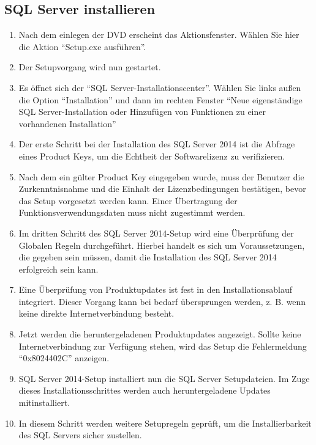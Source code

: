       \subsection{SQL Server installieren}
        \begin{enumerate}
          \item Nach dem einlegen der DVD erscheint das Aktionsfenster. Wählen Sie
          hier die Aktion \enquote{Setup.exe ausführen}.
          \item Der Setupvorgang wird nun gestartet.
          \item Es öffnet sich der \enquote{SQL Server-Installationscenter}.
          Wählen Sie links außen die Option \enquote{Installation} und dann im
          rechten Fenster \enquote{Neue eigenständige SQL Server-Installation
          oder Hinzufügen von Funktionen zu einer vorhandenen Installation}
          \item Der erste Schritt bei der Installation des SQL Server 2014
          ist die Abfrage eines Product Keys, um die Echtheit der Softwarelizenz
          zu verifizieren.
          \item Nach dem ein gülter Product Key eingegeben wurde, muss der
          Benutzer die Zurkenntnisnahme und die Einhalt der Lizenzbedingungen
          bestätigen, bevor das Setup vorgesetzt werden kann. Einer Übertragung
          der Funktionsverwendungsdaten muss nicht zugestimmt werden.
          \item Im dritten Schritt des SQL Server 2014-Setup wird eine
          Überprüfung der Globalen Regeln durchgeführt. Hierbei handelt es sich
          um Voraussetzungen, die gegeben sein müssen, damit die Installation
          des SQL Server 2014 erfolgreich sein kann.
          \item Eine Überprüfung von Produktupdates ist fest in den
          Installationsablauf integriert. Dieser Vorgang kann bei bedarf
          übersprungen werden, z. B. wenn keine direkte Internetverbindung
          besteht.
\clearpage
          \item Jetzt werden die heruntergeladenen Produktupdates angezeigt.
          Sollte keine Internetverbindung zur Verfügung stehen, wird das Setup
          die Fehlermeldung \enquote{0x8024402C} anzeigen.
          \item SQL Server 2014-Setup installiert nun die SQL Server
          Setupdateien. Im Zuge dieses Installationsschrittes werden auch
          heruntergeladene Updates mitinstalliert.
\clearpage
          \item In diesem Schritt werden weitere Setupregeln geprüft, um die
          Installierbarkeit des SQL Servers sicher zustellen.
          

\end{enumerate}
